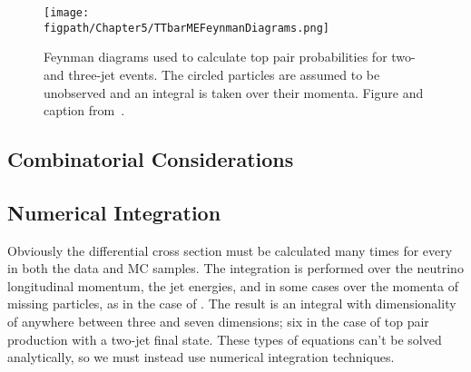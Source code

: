\begin{figure}[!hbt]
    \centering
    \texttt{[image: \\figpath/Chapter5/TTbarMEFeynmanDiagrams.png]}
    \caption{Feynman diagrams used to calculate top pair probabilities for two- and three-jet events. The circled particles are assumed to be unobserved and an integral is taken over their momenta. Figure and caption from~\cite{Dong2008}.}
    \label{fig:TTbarMEFeynmanDiagrams}
\end{figure}

\subsection{Combinatorial Considerations}


\begin{comment}
Peter:
Several of the diagrams have ambiguities in their final state: for example, the s-channel has two kinematically distinct bottom quarks in the final state. Choosing which jet should be matched to a given parton is difficult; this analysis solves the problem by calculating the differential cross section under both assumptions and adding the answers together. However, in the case of the t-channel diagram, the tagging information is used to match the final-state bottom quark to the tagged jet, improving the sensitivity of the calculation.

The combinations of matching jets to quarks are chosen based on the principle that heavy quarks should be matched to tagged jets whenever possible. In cases of ambiguity, all different combinations are tried. This is true except in the case of the top pair diagram, which has
too many ambiguities and is too computationally expensive to try all
combinations. In this case, only the two combinations of assigning tagged jets to bottom quarks are calculated.
\end{comment}



\subsection{Numerical Integration}

Obviously the differential cross section must be calculated many times for every in both the data and MC samples.
The integration is performed over the neutrino longitudinal momentum, the jet energies, and in some cases over the momenta of missing particles, as in the case of \ttbar.
The result is an integral with dimensionality of anywhere between three and seven dimensions; six in the case of top pair production with a two-jet final state.
These types of equations can't be solved analytically, so we must instead use numerical integration techniques. 

